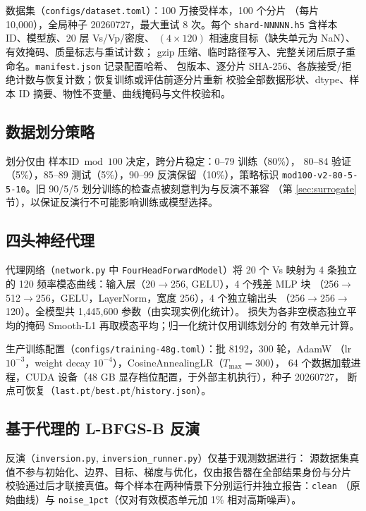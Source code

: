 \documentclass[UTF8,a4paper,11pt]{ctexart}
\begin{document}
数据集（\texttt{configs/dataset.toml}）：100 万接受样本，100 个分片
（每片 10{,}000），全局种子 20260727，最大重试 8 次。每个
\texttt{shard-NNNNN.h5} 含样本 ID、模型族、20 层 Vs/Vp/密度、
\((4\times120)\) 相速度目标（缺失单元为 NaN）、有效掩码、质量标志与重试计数；
gzip 压缩、临时路径写入、完整关闭后原子重命名。\texttt{manifest.json} 记录配置哈希、
包版本、逐分片 SHA-256、各族接受/拒绝计数与恢复计数；恢复训练或评估前逐分片重新
校验全部数据形状、dtype、样本 ID 摘要、物性不变量、曲线掩码与文件校验和。

\subsection{数据划分策略}
划分仅由 \(\text{样本ID} \bmod 100\) 决定，跨分片稳定：0--79 训练（80\%），
80--84 验证（5\%），85--89 测试（5\%），90--99 反演保留（10\%），策略标识
\texttt{mod100-v2-80-5-5-10}。旧 90/5/5 划分训练的检查点被刻意判为与反演不兼容
（第 \ref{sec:surrogate} 节），以保证反演行不可能影响训练或模型选择。

\subsection{四头神经代理}\label{sec:net}
代理网络（\texttt{network.py} 中 \texttt{FourHeadForwardModel}）将 20 个 Vs 映射为
4 条独立的 120 频率模态曲线：输入层（20\(\to\)256, GELU），4 个残差 MLP 块
（256\(\to\)512\(\to\)256，GELU，LayerNorm，宽度 256），4 个独立输出头
（256\(\to\)256\(\to\)120）。全模型共 1{,}445{,}600 参数（由实现实例化统计）。
损失为各非空模态独立平均的掩码 Smooth-L1 再取模态平均；归一化统计仅用训练划分的
有效单元计算。

生产训练配置（\texttt{configs/training-48g.toml}）：批 8192，300 轮，AdamW
（lr \(10^{-3}\)，weight decay \(10^{-4}\)），CosineAnnealingLR（\(T_{\max}=300\)），
64 个数据加载进程，CUDA 设备（48 GB 显存档位配置，于外部主机执行），种子 20260727，
断点可恢复（\texttt{last.pt}/\texttt{best.pt}/\texttt{history.json}）。

\subsection{基于代理的 L-BFGS-B 反演}\label{sec:inv-method}
反演（\texttt{inversion.py}, \texttt{inversion\_runner.py}）仅基于观测数据进行：
源数据集真值不参与初始化、边界、目标、梯度与优化，仅由报告器在全部结果身份与分片
校验通过后才联接真值。每个样本在两种情景下分别运行并独立报告：\texttt{clean}
（原始曲线）与 \texttt{noise\_1pct}（仅对有效模态单元加 1\% 相对高斯噪声）。
\end{document}
